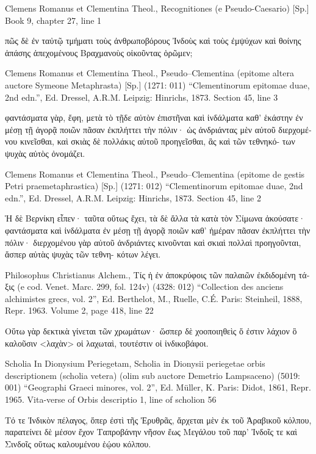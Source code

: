 \documentclass[12pt,letterpaper,twoside,final]{memoir}
\begin{document}
\begin{greek}
Clemens Romanus et Clementina Theol., Recognitiones (e Pseudo-Caesario) [Sp.] 
Book 9, chapter 27, line 1

                        πῶς δὲ ἐν ταὐτῷ τμήματι τοὺς ἀνθρωποβόρους Ἰνδοὺς 
καὶ τοὺς ἐμψύχων καὶ θοίνης ἁπάσης ἀπεχομένους Βραχμανοὺς οἰκοῦντας 
ὁρῶμεν; 



Clemens Romanus et Clementina Theol., Pseudo–Clementina (epitome altera auctore Symeone Metaphrasta) [Sp.] (1271: 011)
“Clementinorum epitomae duae, 2nd edn.”, Ed. Dressel, A.R.M.
Leipzig: Hinrichs, 1873.
Section 45, line 3

                                                      φαντάσματα γὰρ, ἔφη, μετὰ 
τὸ τῇδε αὐτὸν ἐπιστῆναι καὶ ἰνδάλματα καθ' ἑκάστην ἐν μέσῃ τῇ ἀγορᾷ 
ποιῶν πᾶσαν ἐκπλήττει τὴν πόλιν· ὡς ἀνδριάντας μὲν αὐτοῦ διερχομένου 
κινεῖσθαι, καὶ σκιὰς δὲ πολλάκις αὐτοῦ προηγεῖσθαι, ἃς καὶ τῶν τεθνηκό-
των ψυχὰς αὐτὸς ὀνομάζει. 



Clemens Romanus et Clementina Theol., Pseudo–Clementina (epitome de gestis Petri praemetaphrastica) [Sp.] (1271: 012)
“Clementinorum epitomae duae, 2nd edn.”, Ed. Dressel, A.R.M.
Leipzig: Hinrichs, 1873.
Section 45, line 2

Ἡ δὲ Βερνίκη εἶπεν· ταῦτα οὕτως ἔχει, τὰ δὲ ἄλλα τὰ κατὰ 
τὸν Σίμωνα ἀκούσατε· φαντάσματα καὶ ἰνδάλματα ἐν μέσῃ τῇ ἀγορᾷ ποιῶν 
καθ' ἡμέραν πᾶσαν ἐκπλήττει τὴν πόλιν· διερχομένου γὰρ αὐτοῦ ἀνδριάντες 
κινοῦνται καὶ σκιαὶ πολλαὶ προηγοῦνται, ἅσπερ αὐτὰς ψυχὰς τῶν τεθνη-
κότων λέγει. 


Philosophus Christianus Alchem., Τίς ἡ ἐν ἀποκρύφοις τῶν παλαιῶν ἐκδιδομένη τάξις (e cod. Venet. Marc. 299, fol. 124v) (4328: 012)
“Collection des anciens alchimistes grecs, vol. 2”, Ed. Berthelot, M., Ruelle, C.É.
Paris: Steinheil, 1888, Repr. 1963.
Volume 2, page 418, line 22

              Οὕτω γὰρ δεκτικὰ γίνεται τῶν χρωμάτων· 
ὥσπερ δὲ χοοποιηθεὶς ὅ ἐστιν λάχιον ὃ καλοῦσιν <λαχὰν> οἱ λαχωταὶ, 
τουτέστιν οἱ ἰνδικοβάφοι. 



Scholia In Dionysium Periegetam, Scholia in Dionysii periegetae orbis descriptionem (scholia vetera) (olim sub auctore Demetrio Lampsaceno) (5019: 001)
“Geographi Graeci minores, vol. 2”, Ed. Müller, K.
Paris: Didot, 1861, Repr. 1965.
Vita-verse of Orbis descriptio 1, line of scholion 56

                               Τό τε Ἰνδικὸν πέλαγος, 
ὅπερ ἐστὶ τῆς Ἐρυθρᾶς, ἄρχεται μὲν ἐκ τοῦ Ἀραβικοῦ 
κόλπου, παρατείνει δὲ μέσον ἔχον Ταπροβάνην νῆσον 
ἕως Μεγάλου τοῦ παρ' Ἰνδοῖς τε καὶ Σινδοῖς οὕτως 
καλουμένου ἑῴου κόλπου. 




\end{greek}
\end{document}
